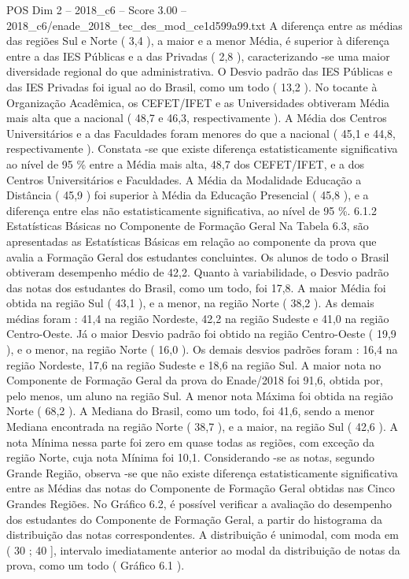 \begin{textsample}{POS Dim 2 – 2018\_c6 – Score 3.00 – 2018\_c6/enade\_2018\_tec\_des\_mod\_ce1d599a99.txt}
A diferença entre as médias das regiões Sul e Norte ( 3,4 ), a maior e a menor Média, é superior à diferença entre a das IES Públicas e a das Privadas ( 2,8 ), caracterizando -se uma maior diversidade regional do que administrativa.
O Desvio padrão das IES Públicas e das IES Privadas foi igual ao do Brasil, como um todo ( 13,2 ).
No tocante à Organização Acadêmica, os CEFET/IFET e as Universidades obtiveram Média mais alta que a nacional ( 48,7 e 46,3, respectivamente ).
A Média dos Centros Universitários e a das Faculdades foram menores do que a nacional ( 45,1 e 44,8, respectivamente ).
Constata -se que existe diferença estatisticamente significativa ao nível de 95 \% entre a Média mais alta, 48,7 dos CEFET/IFET, e a dos Centros Universitários e Faculdades.
A Média da Modalidade Educação a Distância ( 45,9 ) foi superior à Média da Educação Presencial ( 45,8 ), e a diferença entre elas não estatisticamente significativa, ao nível de 95 \%. 6.1.2 Estatísticas Básicas no Componente de Formação Geral Na Tabela 6.3, são apresentadas as Estatísticas Básicas em relação ao componente da prova que avalia a Formação Geral dos estudantes concluintes.
Os alunos de todo o Brasil obtiveram desempenho médio de 42,2.
Quanto à variabilidade, o Desvio padrão das notas dos estudantes do Brasil, como um todo, foi 17,8.
A maior Média foi obtida na região Sul ( 43,1 ), e a menor, na região Norte ( 38,2 ).
As demais médias foram : 41,4 na região Nordeste, 42,2 na região Sudeste e 41,0 na região Centro-Oeste.
Já o maior Desvio padrão foi obtido na região Centro-Oeste ( 19,9 ), e o menor, na região Norte ( 16,0 ).
Os demais desvios padrões foram : 16,4 na região Nordeste, 17,6 na região Sudeste e 18,6 na região Sul.
A maior nota no Componente de Formação Geral da prova do Enade/2018 foi 91,6, obtida por, pelo menos, um aluno na região Sul.
A menor nota Máxima foi obtida na região Norte ( 68,2 ).
A Mediana do Brasil, como um todo, foi 41,6, sendo a menor Mediana encontrada na região Norte ( 38,7 ), e a maior, na região Sul ( 42,6 ).
A nota Mínima nessa parte foi zero em quase todas as regiões, com exceção da região Norte, cuja nota Mínima foi 10,1.
Considerando -se as notas, segundo Grande Região, observa -se que não existe diferença estatisticamente significativa entre as Médias das notas do Componente de Formação Geral obtidas nas Cinco Grandes Regiões.
No Gráfico 6.2, é possível verificar a avaliação do desempenho dos estudantes do Componente de Formação Geral, a partir do histograma da distribuição das notas correspondentes.
A distribuição é unimodal, com moda em ( 30 ; 40 ], intervalo imediatamente anterior ao modal da distribuição de notas da prova, como um todo ( Gráfico 6.1 ).

\end{textsample}
